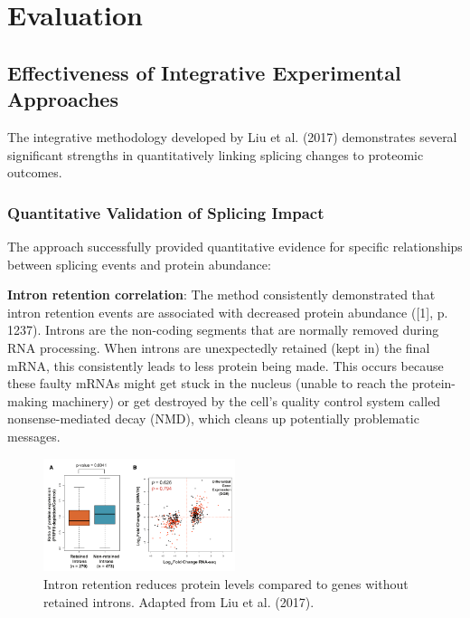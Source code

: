 \documentclass[12pt,a4paper]{article}
\begin{document}
\section{Evaluation}

\subsection{Effectiveness of Integrative Experimental Approaches}

The integrative methodology developed by Liu et al. (2017) demonstrates several significant strengths in quantitatively linking splicing changes to proteomic outcomes.

\subsubsection{Quantitative Validation of Splicing Impact}

The approach successfully provided quantitative evidence for specific relationships between splicing events and protein abundance:

\textbf{Intron retention correlation}: The method consistently demonstrated that intron retention events are associated with decreased protein abundance ([1], p. 1237). Introns are the non-coding segments that are normally removed during RNA processing. When introns are unexpectedly retained (kept in) the final mRNA, this consistently leads to less protein being made. This occurs because these faulty mRNAs might get stuck in the nucleus (unable to reach the protein-making machinery) or get destroyed by the cell's quality control system called nonsense-mediated decay (NMD), which cleans up potentially problematic messages.

\begin{figure}[H]
\centering
\includegraphics[width=0.5\textwidth]{intron_retention_figure_6_liu.png}
\caption{Intron retention reduces protein levels compared to genes without retained introns. Adapted from Liu et al. (2017).}
\label{fig:intron_retention}
\end{figure}
\end{document}
